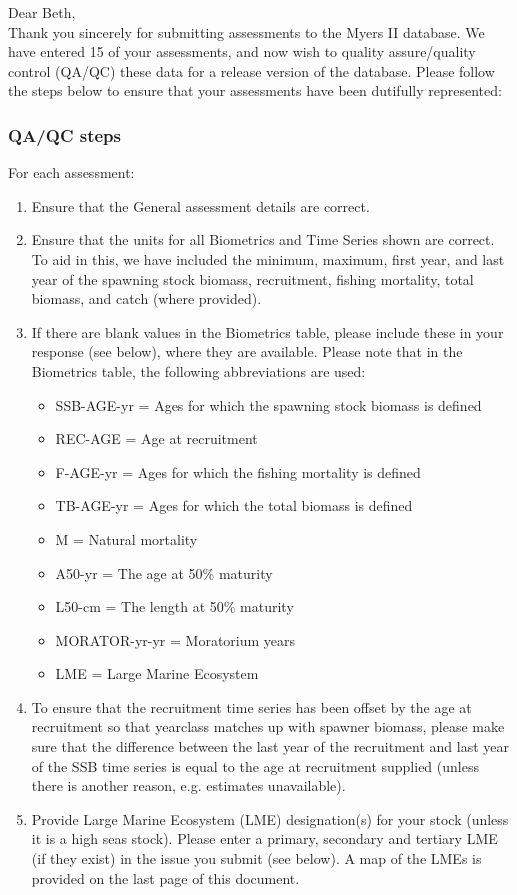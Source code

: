 \documentclass [a4paper, 10pt] {article}
\begin{document}
\noindent Dear Beth,\\

\noindent Thank you sincerely for submitting assessments to the Myers II database. We have entered 15 of your assessments, and now wish to quality assure/quality control (QA/QC) these data for a release version of the database. Please follow the steps below to ensure that your assessments have been dutifully represented:
\subsubsection{QA/QC steps}
For each assessment:
\begin{enumerate}
\item Ensure that the General assessment details are correct.
\item Ensure that the units for all Biometrics and Time Series shown are correct. To aid in this, we have included the minimum, maximum, first year, and last year of the spawning stock biomass, recruitment, fishing mortality, total biomass, and  catch  (where provided). 
\item If there are blank values in the Biometrics table, please include these in your response (see below), where they are available.
Please note that in the Biometrics table, the following abbreviations are used:
\begin{itemize}
\item SSB-AGE-yr  = Ages for which the spawning stock biomass is defined
\item REC-AGE     = Age at recruitment
\item F-AGE-yr    = Ages for which the fishing mortality is defined 
\item TB-AGE-yr   = Ages for which the total biomass is defined
\item M      = Natural mortality
\item A50-yr      = The age at 50\% maturity
\item L50-cm      = The length at 50\% maturity
\item MORATOR-yr-yr = Moratorium years
\item LME = Large Marine Ecosystem\\
\end{itemize}
\item To ensure that the recruitment time series has been offset by the age at recruitment so that yearclass matches up with spawner biomass, please make sure that the difference between the last year of the recruitment and last year of the SSB time series is equal to the age at recruitment supplied (unless there is another reason, e.g. estimates unavailable). 
\item Provide Large Marine Ecosystem (LME) designation(s) for your stock (unless it is a high seas stock). Please enter a primary, secondary and tertiary LME (if they exist) in the issue you submit (see below). A map of the LMEs is provided on the last page of this document. 
\end{enumerate}
\vspace{-.25in}
\end{document}
